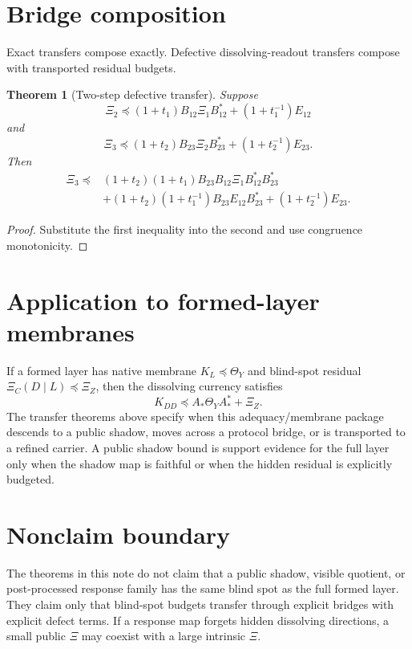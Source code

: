 \documentclass[11pt]{article}
\newtheorem{theorem}{Theorem}[section]
\newcommand{\pre}{\preceq}
\begin{document}
\section{Bridge composition}
Exact transfers compose exactly.  Defective dissolving-readout transfers compose with transported residual budgets.

\begin{theorem}[Two-step defective transfer]
Suppose
\[
  \Xi_2\pre(1+t_1)B_{12}\Xi_1B_{12}^*+(1+t_1^{-1})E_{12}
\]
and
\[
  \Xi_3\pre(1+t_2)B_{23}\Xi_2B_{23}^*+(1+t_2^{-1})E_{23}.
\]
Then
\[
\boxed{
\begin{aligned}
\Xi_3\pre{}&(1+t_2)(1+t_1)B_{23}B_{12}\Xi_1B_{12}^*B_{23}^*\\
&+(1+t_2)(1+t_1^{-1})B_{23}E_{12}B_{23}^*+(1+t_2^{-1})E_{23}.
\end{aligned}}
\]
\end{theorem}

\begin{proof}
Substitute the first inequality into the second and use congruence monotonicity.
\end{proof}

\section{Application to formed-layer membranes}
If a formed layer has native membrane $K_L\pre\Theta_Y$ and blind-spot residual $\Xi_C(D\mid L)\pre\Xi_Z$, then the dissolving currency satisfies
\[
  K_{DD}\pre A_*\Theta_YA_*^*+\Xi_Z.
\]
The transfer theorems above specify when this adequacy/membrane package descends to a public shadow, moves across a protocol bridge, or is transported to a refined carrier.  A public shadow bound is support evidence for the full layer only when the shadow map is faithful or when the hidden residual is explicitly budgeted.

\section{Nonclaim boundary}
The theorems in this note do not claim that a public shadow, visible quotient, or post-processed response family has the same blind spot as the full formed layer.  They claim only that blind-spot budgets transfer through explicit bridges with explicit defect terms.  If a response map forgets hidden dissolving directions, a small public $\Xi$ may coexist with a large intrinsic $\Xi$.
\end{document}
